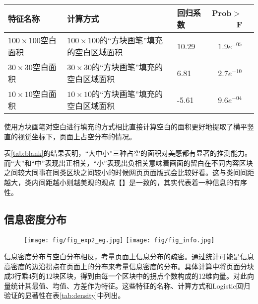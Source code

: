 \begin{table}[H]
  \centering
  \small
  \begin{tabular}{lllrr}
    \hline
     特征名称 & 计算方式 & 回归系数 & Prob$>$F \\
    \hline
    $100\times100$空白面积 & $100\times100$的“方块画笔”填充的空白区域面积 & 10.29 & $1.9e^{-05}$\\
    $30\times30$空白面积 & $30\times30$的“方块画笔”填充的空白区域面积 & 6.81 & $2.7e^{-10}$\\
    $10\times10$空白面积 & $10\times10$的“方块画笔”填充的空白区域面积 & -5.61 & $9.6e^{-04}$\\
    \hline
  \end{tabular}
\end{table}

使用方块画笔对空白进行填充的方式相比直接计算空白的面积更好地提取了横平竖直的视觉坐标下，页面上占空分布的情况。

表\ref{tab:blank}的结果表明，“大中小”三种占空的面积对美感都有显著的推测能力。而“大”和“中”表现出正相关，“小”表现出负相关意味着画面的留白在不同内容区块之间较大同事在同类区块之间较小的时候网页页面版式会比较好看。这与类间间距越大，类内间距越小则越美观的观点【】是一致的，其实代表着一种信息的有序性。

\subsection{信息密度分布}
\begin{figure}[H]
  \texttt{[image: fig/fig\_exp2\_eg.jpg]}
  \texttt{[image: fig/fig\_info.jpg]}
\end{figure}
信息密度分布与空白分布相反，考量页面上信息分布的疏密。通过统计可能是信息高密度的边沿拐点在页面上的分布来考量信息密度的分布。具体计算中将页面分块成3行乘4列的12块区块，得到由每一个区块中的拐点个数构成的12维向量。对此向量统计其最值、均值、方差作为特征。这些特征的名称、计算方式和Logistic回归验证的显著性在表\ref{tab:density}中列出。

